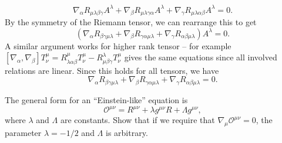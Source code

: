 \documentclass{../../templates/lkx_pset}
\begin{document}
\begin{solution}
	\[
		\nabla_\alpha R_{\mu\lambda\beta\gamma}A^\lambda
		+\nabla_\beta R_{\mu\lambda\gamma\alpha}A^\lambda
		+\nabla_\gamma R_{\mu\lambda\alpha\beta}A^\lambda = 0.
	\]
	By the symmetry of the Riemann tensor, we can rearrange this to get
	\[
		(\nabla_\alpha R_{\beta\gamma\mu\lambda}
		+\nabla_\beta R_{\gamma\alpha\mu\lambda}
		+\nabla_\gamma R_{\alpha\beta\mu\lambda})A^\lambda = 0.
	\]
	A similar argument works for higher rank tensor -- for example $[\nabla_\alpha, \nabla_\beta] T^{\mu}_\nu = R^\mu_{\lambda\alpha\beta} T^{\mu}_\nu - R^\lambda_{\mu\beta\gamma} T^{\mu}_{\nu}$ gives the same equations since all involved relations are linear. Since this holds for all tensors, we have
	\[
		\nabla_\alpha R_{\beta\gamma\mu\lambda}
		+\nabla_\beta R_{\gamma\alpha\mu\lambda}
		+\nabla_\gamma R_{\alpha\beta\mu\lambda} = 0.
	\]
\end{solution}

\begin{problem}{5}
The general form for an ``Einstein-like'' equation is
\[
	\mathcal{O}^{\mu\nu} = R^{\mu\nu} + \lambda g^{\mu\nu} R + \Lambda g^{\mu\nu},
\]
where $\lambda$ and $\Lambda$ are constants. Show that if we require that $\nabla_{\mu}\mathcal{O}^{\mu\nu}=0$, the parameter $\lambda=-1/2$ and $\Lambda$ is arbitrary.
\end{problem}
\end{document}
